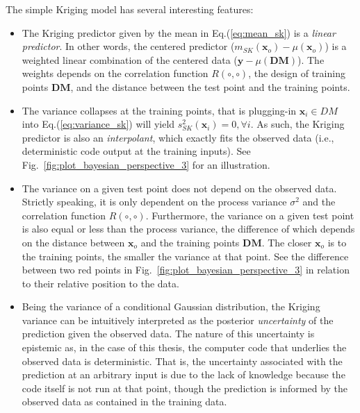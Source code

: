 The simple Kriging model has several interesting features:
\begin{itemize}

	\item The Kriging predictor given by the mean in Eq.(\ref{eq:mean_sk}) is a \emph{linear predictor}. 
	      In other words, the centered predictor ($m_{SK}(\bm{x}_o) - \mu (\bm{x}_o)$)  is a weighted linear combination of the centered data 
	      ($\mathbf{y} - \mu(\mathbf{DM})$).
				The weights depends on the correlation function $R(\circ,\circ)$, the design of training points $\mathbf{DM}$, and the distance between the test point and the training points.

	\item The variance collapses at the training points, that is plugging-in $\mathbf{x}_i \in DM$ into Eq.(\ref{eq:variance_sk}) will yield $s^2_{SK}(\mathbf{x}_i) = 0, \forall i$.
	      As such, the Kriging predictor is also an \emph{interpolant}, which exactly fits the observed data (i.e., deterministic code output at the training inputs).
				See Fig.~\ref{fig:plot_bayesian_perspective_3} for an illustration.

	\item The variance on a given test point does not depend on the observed data.
	      Strictly speaking, it is only dependent on the process variance $\sigma^2$ and the correlation function $R(\circ,\circ)$.
				Furthermore, the variance on a given test point is also equal or less than the process variance, 
				the difference of which depends on the distance between $\bm{x}_o$ and the training points $\mathbf{DM}$.
				The closer $\bm{x}_o$ is to the training points, the smaller the variance at that point.
				See the difference between two red points in Fig.~\ref{fig:plot_bayesian_perspective_3} in relation to their relative position to the data.

	\item Being the variance of a conditional Gaussian distribution, the Kriging variance can be intuitively interpreted as the posterior \emph{uncertainty} of the prediction given the observed data.
	      The nature of this uncertainty is epistemic as, in the case of this thesis, the computer code that underlies the observed data is deterministic.
				That is, the uncertainty associated with the prediction at an arbitrary input is due to the lack of knowledge because the code itself is not run at that point,
				though the prediction is informed by the observed data as contained in the training data.
\end{itemize}

